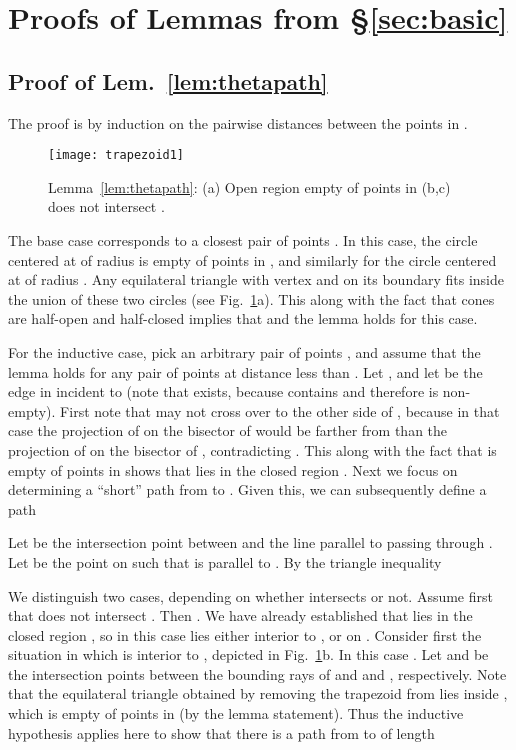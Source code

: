 \documentclass[11pt]{article}
\begin{document}
\section{Proofs of Lemmas from \S\ref{sec:basic}}
\label{sec:proofs}

\subsection{Proof of Lem.~\ref{lem:thetapath}}
The proof is by induction on the pairwise distances between the points in .
\begin{figure}[htpb]
\centering
\texttt{[image: trapezoid1]}
\caption{Lemma~\ref{lem:thetapath}: (a) Open region empty of points in  (b,c)  does not intersect .}
\label{fig:trapezoid1}
\end{figure}
The base case corresponds to a closest pair of points . In this case, the circle centered at  of radius  is empty of points in , and similarly for the circle centered at  of radius . Any equilateral triangle with vertex  and  on its boundary fits inside the union of these two circles (see Fig.~\ref{fig:trapezoid1}a). This along with the fact that cones are half-open and half-closed implies that  and the lemma holds for this case.

For the inductive case, pick an arbitrary pair of points , and assume that the lemma holds for any pair of points at distance less than .
Let , and let  be the edge in  incident to  (note that  exists, because  contains  and therefore is non-empty).
First note that  may not cross over to the other side of , because in that case the projection of  on the bisector of  would be farther from  than the projection of  on the bisector of , contradicting . This along with the fact that  is empty of points in  shows that  lies in the closed region . Next we focus on determining a ``short'' path  from  to . Given this, we can subsequently define a path

Let  be the intersection point between  and the line parallel to  passing through . Let  be the point on  such that  is parallel to . By the triangle inequality

We distinguish two cases, depending on whether  intersects  or not.
Assume first that  does not intersect . Then . We have already established that  lies in the closed region , so in this case  lies either interior to , or on . Consider first the situation in which  is interior to , depicted in Fig.~\ref{fig:trapezoid1}b. In this case . Let  and  be the intersection points between the bounding rays of  and  and , respectively. Note that the equilateral triangle obtained by removing the trapezoid  from  lies inside , which is empty of points in  (by the lemma statement). Thus the inductive hypothesis applies here to show that there is a path  from  to  of length
\end{document}
